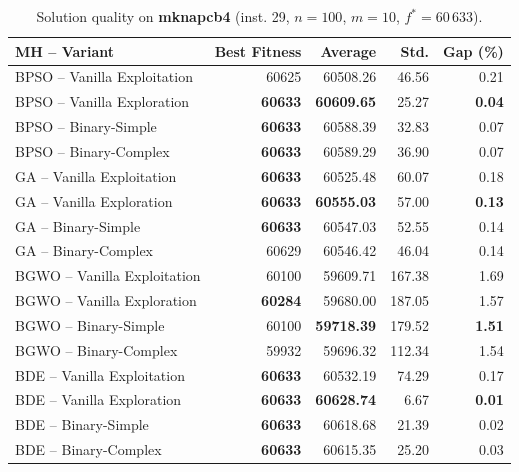 \documentclass[journal,article,submit,moreauthors]{Definitions/mdpi}
\begin{document}
\begin{table}[htbp]
  \centering
  \small
  \caption{Solution quality on \textbf{mknapcb4} (inst. 29, $n=100$, $m=10$, $f^*=60\,633$).}
  \label{tab:calidad_mknapcb4_29}
  \begin{tabular}{lrrrr}
    \toprule
    \textbf{MH -- Variant} &
    \textbf{Best Fitness} &
    \textbf{Average} &
    \textbf{Std.} &
    \textbf{Gap (\%)} \\
    \midrule
    BPSO -- Vanilla Exploitation &          60625 &         60508.26 &  46.56 &         0.21 \\
    BPSO -- Vanilla Exploration  & \textbf{60633} & \textbf{60609.65} &  25.27 & \textbf{0.04} \\
    BPSO -- Binary-Simple        & \textbf{60633} &         60588.39 &  32.83 &         0.07 \\
    BPSO -- Binary-Complex       & \textbf{60633} &         60589.29 &  36.90 &         0.07 \\
    \midrule
    GA -- Vanilla Exploitation   & \textbf{60633} &         60525.48 &  60.07 &         0.18 \\
    GA -- Vanilla Exploration    & \textbf{60633} & \textbf{60555.03} &  57.00 & \textbf{0.13} \\
    GA -- Binary-Simple          & \textbf{60633} &         60547.03 &  52.55 &         0.14 \\
    GA -- Binary-Complex         &          60629 &         60546.42 &  46.04 &         0.14 \\
    \midrule
    BGWO -- Vanilla Exploitation &          60100 &         59609.71 & 167.38 &         1.69 \\
    BGWO -- Vanilla Exploration  & \textbf{60284} &         59680.00 & 187.05 &         1.57 \\
    BGWO -- Binary-Simple        &          60100 & \textbf{59718.39} & 179.52 & \textbf{1.51} \\
    BGWO -- Binary-Complex       &          59932 &         59696.32 & 112.34 &         1.54 \\
    \midrule
    BDE -- Vanilla Exploitation  & \textbf{60633} &         60532.19 &  74.29 &         0.17 \\
    BDE -- Vanilla Exploration   & \textbf{60633} & \textbf{60628.74} &   6.67 & \textbf{0.01} \\
    BDE -- Binary-Simple         & \textbf{60633} &         60618.68 &  21.39 &         0.02 \\
    BDE -- Binary-Complex        & \textbf{60633} &         60615.35 &  25.20 &         0.03 \\
    \bottomrule
  \end{tabular}
\end{table}
\end{document}
